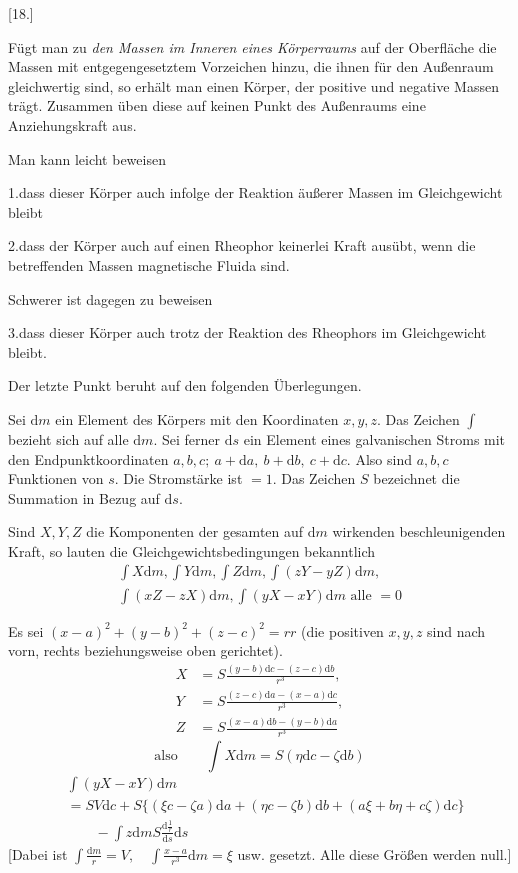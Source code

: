\begin{center}[18.]\end{center}
Fügt man zu \textit{den Massen im Inneren eines Körperraums} auf der Oberfläche die Massen mit entgegengesetztem Vorzeichen hinzu, die ihnen für den Außenraum gleichwertig sind, so erhält man einen Körper, der positive und negative Massen trägt. Zusammen üben diese auf keinen Punkt des Außenraums eine Anziehungskraft aus.

Man kann leicht beweisen

1.\quad dass dieser Körper auch infolge der Reaktion äußerer Massen im Gleichgewicht bleibt

2.\quad dass der Körper auch auf einen Rheophor keinerlei Kraft ausübt, wenn die betreffenden Massen magnetische Fluida sind.

Schwerer ist dagegen zu beweisen

3.\quad dass dieser Körper auch trotz der Reaktion des Rheophors im Gleichgewicht bleibt.

Der letzte Punkt beruht auf den folgenden Überlegungen.

Sei $\mathrm dm$ ein Element des Körpers mit den Koordinaten $x,y,z$. Das Zeichen $\int$ bezieht sich auf alle $\mathrm dm$. Sei ferner $\mathrm ds$ ein Element eines galvanischen Stroms mit den Endpunktkoordinaten $a,b,c;\ a+\mathrm da,\ b+\mathrm db,\ c+\mathrm dc$. Also sind $a,b,c$ Funktionen von $s$. Die Stromstärke ist $=1$. Das Zeichen $S$ bezeichnet die Summation in Bezug auf $\mathrm ds$.

Sind $X,Y,Z$ die Komponenten der gesamten auf $\mathrm dm$ wirkenden beschleunigenden Kraft, so lauten die Gleichgewichtsbedingungen bekanntlich
\[
\begin{gathered}
\int X\mathrm dm,\int Y\mathrm dm,\int Z\mathrm dm,\int(zY-yZ)\mathrm dm,\\
\int(xZ-zX)\mathrm dm,\int(yX-xY)\mathrm dm\text{ alle }=0
\end{gathered}
\]

Es sei $(x-a)^2+(y-b)^2+(z-c)^2=rr$ (die positiven $x,y,z$ sind nach vorn, rechts beziehungsweise oben gerichtet).
\[
\begin{aligned}
X&=S\frac{(y-b)\mathrm dc-(z-c)\mathrm db}{r^3},\\
Y&=S\frac{(z-c)\mathrm da-(x-a)\mathrm dc}{r^3},\\
Z&=S\frac{(x-a)\mathrm db-(y-b)\mathrm da}{r^3}
\end{aligned}
\]
\[
\text{also}\qquad\int X\mathrm dm=S(\eta\mathrm dc-\zeta\mathrm db)
\]
\[
\begin{aligned}
&\int(yX-xY)\mathrm dm\\
&=SV\mathrm dc+S\{(\xi c-\zeta a)\mathrm da+(\eta c-\zeta b)\mathrm db+(a\xi+b\eta+c\zeta)\mathrm dc\}\\
&\qquad-\int z\mathrm dmS\frac{\mathrm d\frac1r}{\mathrm ds}\mathrm ds
\end{aligned}
\]
[Dabei ist $\displaystyle\int\frac{\mathrm dm}{r}=V,\quad\int\frac{x-a}{r^3}\mathrm dm=\xi$ usw. gesetzt. Alle diese Größen werden null.]

